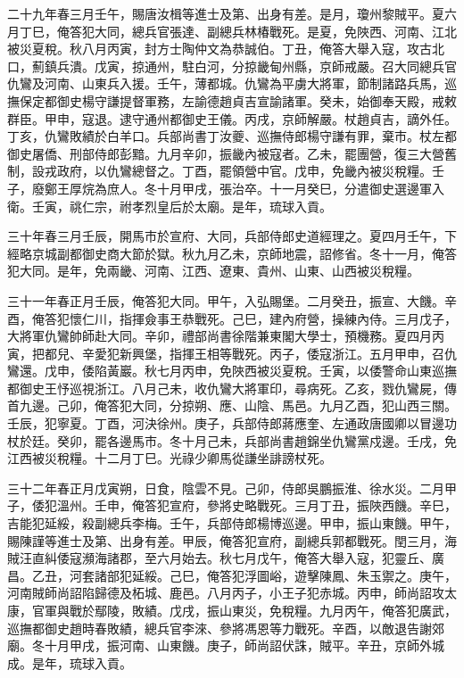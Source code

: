\begin{pinyinscope}
二十九年春三月壬午，賜唐汝楫等進士及第、出身有差。是月，瓊州黎賊平。夏六月丁巳，俺答犯大同，總兵官張達、副總兵林椿戰死。是夏，免陜西、河南、江北被災夏稅。秋八月丙寅，封方士陶仲文為恭誠伯。丁丑，俺答大舉入寇，攻古北口，薊鎮兵潰。戊寅，掠通州，駐白河，分掠畿甸州縣，京師戒嚴。召大同總兵官仇鸞及河南、山東兵入援。壬午，薄都城。仇鸞為平虜大將軍，節制諸路兵馬，巡撫保定都御史楊守謙提督軍務，左諭德趙貞吉宣諭諸軍。癸未，始御奉天殿，戒敕群臣。甲申，寇退。逮守通州都御史王儀。丙戌，京師解嚴。杖趙貞吉，謫外任。丁亥，仇鸞敗績於白羊口。兵部尚書丁汝夔、巡撫侍郎楊守謙有罪，棄市。杖左都御史屠僑、刑部侍郎彭黯。九月辛卯，振畿內被寇者。乙未，罷團營，復三大營舊制，設戎政府，以仇鸞總督之。丁酉，罷領營中官。戊申，免畿內被災稅糧。壬子，廢鄭王厚烷為庶人。冬十月甲戌，張治卒。十一月癸巳，分遣御史選邊軍入衛。壬寅，祧仁宗，祔孝烈皇后於太廟。是年，琉球入貢。

三十年春三月壬辰，開馬市於宣府、大同，兵部侍郎史道經理之。夏四月壬午，下經略京城副都御史商大節於獄。秋九月乙未，京師地震，詔修省。冬十一月，俺答犯大同。是年，免兩畿、河南、江西、遼東、貴州、山東、山西被災稅糧。

三十一年春正月壬辰，俺答犯大同。甲午，入弘賜堡。二月癸丑，振宣、大饑。辛酉，俺答犯懷仁川，指揮僉事王恭戰死。己巳，建內府營，操練內侍。三月戊子，大將軍仇鸞帥師赴大同。辛卯，禮部尚書徐階兼東閣大學士，預機務。夏四月丙寅，把都兒、辛愛犯新興堡，指揮王相等戰死。丙子，倭寇浙江。五月甲申，召仇鸞還。戊申，倭陷黃巖。秋七月丙申，免陜西被災夏稅。壬寅，以倭警命山東巡撫都御史王忬巡視浙江。八月己未，收仇鸞大將軍印，尋病死。乙亥，戮仇鸞屍，傳首九邊。己卯，俺答犯大同，分掠朔、應、山陰、馬邑。九月乙酉，犯山西三關。壬辰，犯寧夏。丁酉，河決徐州。庚子，兵部侍郎蔣應奎、左通政唐國卿以冒邊功杖於廷。癸卯，罷各邊馬市。冬十月己未，兵部尚書趙錦坐仇鸞黨戍邊。壬戌，免江西被災稅糧。十二月丁巳。光祿少卿馬從謙坐誹謗杖死。

三十二年春正月戊寅朔，日食，陰雲不見。己卯，侍郎吳鵬振淮、徐水災。二月甲子，倭犯溫州。壬申，俺答犯宣府，參將史略戰死。三月丁丑，振陜西饑。辛巳，吉能犯延綏，殺副總兵李梅。壬午，兵部侍郎楊博巡邊。甲申，振山東饑。甲午，賜陳謹等進士及第、出身有差。甲辰，俺答犯宣府，副總兵郭都戰死。閏三月，海賊汪直糾倭寇瀕海諸郡，至六月始去。秋七月戊午，俺答大舉入寇，犯靈丘、廣昌。乙丑，河套諸部犯延綏。己巳，俺答犯浮圖峪，遊擊陳鳳、朱玉禦之。庚午，河南賊師尚詔陷歸德及柘城、鹿邑。八月丙子，小王子犯赤城。丙申，師尚詔攻太康，官軍與戰於鄢陵，敗績。戊戌，振山東災，免稅糧。九月丙午，俺答犯廣武，巡撫都御史趙時春敗績，總兵官李淶、參將馮恩等力戰死。辛酉，以敵退告謝郊廟。冬十月甲戌，振河南、山東饑。庚子，師尚詔伏誅，賊平。辛丑，京師外城成。是年，琉球入貢。


\end{pinyinscope}

